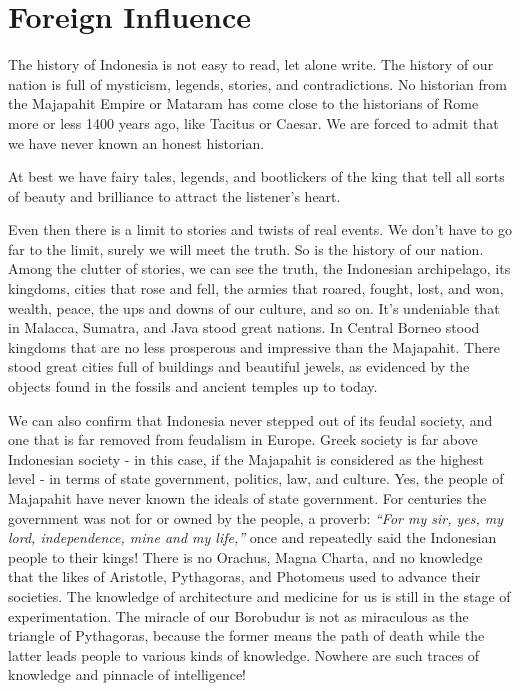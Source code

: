 \section{Foreign Influence}

The history of Indonesia is not easy to read, let alone write. The history of 
our nation is full of mysticism, legends, stories, and contradictions. No historian 
from the Majapahit Empire or Mataram has come close to the historians of Rome more 
or less 1400 years ago, like Tacitus or Caesar. We are forced to admit that we have never known an honest historian.\nline

At best we have fairy tales, legends, and bootlickers of the king that tell all sorts of 
beauty and brilliance to attract the listener's heart.\nline

Even then there is a limit to stories and twists of real events. We don't have to go far to 
the limit, surely we will meet the truth. So is the history of our nation. Among the clutter 
of stories, we can see the truth, the Indonesian archipelago, its kingdoms, cities that 
rose and fell, the armies that roared, fought, lost, and won, wealth, peace, the ups and 
downs of our culture, and so on. It's undeniable that in Malacca, Sumatra, and Java stood 
great nations. In Central Borneo stood kingdoms that are no less prosperous and impressive 
than the Majapahit. There stood great cities full of buildings and beautiful jewels, as 
evidenced by the objects found in the fossils and ancient temples up to today.\nline

We can also confirm that Indonesia never stepped out of its feudal society, and one that is 
far removed from feudalism in Europe. Greek society is far above Indonesian society - in this case, 
if the Majapahit is considered as the highest level - in terms of state government, politics, 
law, and culture. Yes, the people of Majapahit have never known the ideals of state government. 
For centuries the government was not for or owned by the people, a proverb: \emph{“For my sir, yes, my lord, independence, mine and my life,”} 
once and repeatedly said the Indonesian people to their kings! There is no Orachus, Magna Charta, 
and no knowledge that the likes of Aristotle, Pythagoras, and Photomeus used to advance their societies. 
The knowledge of architecture and medicine for us is still in the stage of experimentation. 
The miracle of our Borobudur is not as miraculous as the triangle of Pythagoras, because the former 
means the path of death while the latter leads people to various kinds of knowledge. Nowhere are such 
traces of knowledge and pinnacle of intelligence!\nline

